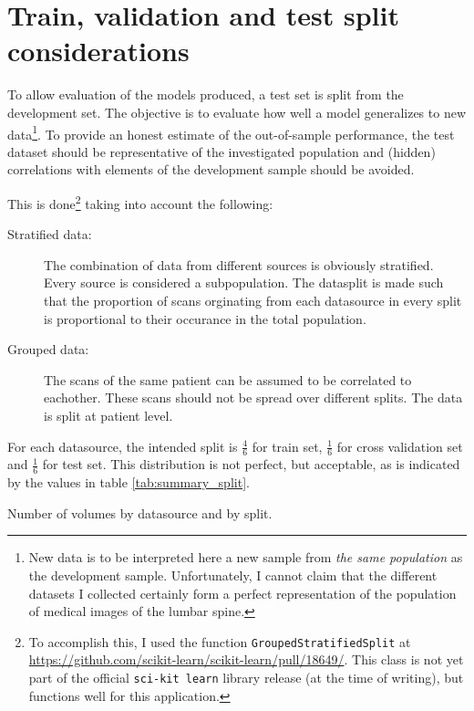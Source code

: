 \newpage
\section{Train, validation and test split considerations\label{sec:trainValTestSplit}}

To allow evaluation of the models produced, a test set is split from the development set.
The objective is to evaluate how well a model generalizes to new data\footnote{
    New data is to be interpreted here a new sample from \textit{the same population} as the development sample.
    Unfortunately, I cannot claim that the different datasets I collected certainly form a perfect representation of the population of medical images of the lumbar spine.}. 
To provide an honest estimate of the out-of-sample performance, the test dataset should be representative of the investigated population and (hidden) correlations with elements of the development sample should be avoided.

This is done\footnote{
    To accomplish this, I used the function \texttt{GroupedStratifiedSplit} at \url{https://github.com/scikit-learn/scikit-learn/pull/18649/}. 
    This class is not yet part of the official \texttt{sci-kit learn} library release (at the time of writing), but functions well for this application.} taking into account the following:
\begin{description}
    \item[Stratified data:] The combination of data from different sources is obviously stratified. Every source is considered a subpopulation. The datasplit is made such that the proportion of scans orginating from each datasource in every split is proportional to their occurance in the total population.
    \item[Grouped data:] The scans of the same patient can be assumed to be correlated to eachother. These scans should not be spread over different splits. The data is split at patient level.
\end{description}

For each datasource, the intended split is $\frac{4}{6}$ for train set, $\frac{1}{6}$ for cross validation set and $\frac{1}{6}$ for test set.
This distribution is not perfect, but acceptable, as is indicated by the values in table \ref{tab:summary_split}.

\begin{table}
 
    
    \caption{Number of volumes by datasource and by split.\label{tab:summary_split}}
  
  \end{table}

